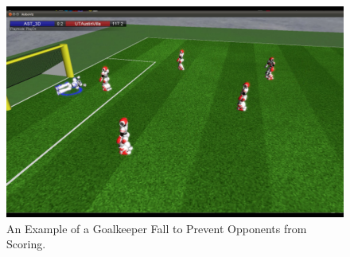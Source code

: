 \begin{figure}[t!]
	\quad \quad
	\includegraphics[trim = 5cm 10cm 30cm 5cm, clip,scale=0.25]{Chapter3/figures/GoalieFall4.png}
	\caption{An Example of a Goalkeeper Fall to Prevent Opponents from Scoring.}
  \label{fig:GoalkeeperFall}
\end{figure}